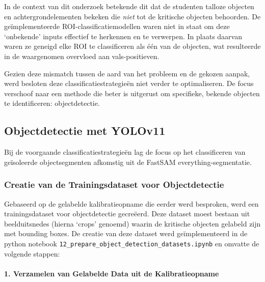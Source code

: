 In de context van dit onderzoek betekende dit dat de studenten talloze objecten en achtergrondelementen bekeken die \textit{niet} tot de kritische objecten behoorden.
De geïmplementeerde ROI-classificatiemodellen waren niet in staat om deze `onbekende' inputs effectief te herkennen en te verwerpen.
In plaats daarvan waren ze geneigd elke ROI te classificeren als één van de objecten, wat resulteerde in de waargenomen overvloed aan vals-positieven.

Gezien deze mismatch tussen de aard van het probleem en de gekozen aanpak, werd besloten deze classificatiestrategieën niet verder te optimaliseren.
De focus verschoof naar een methode die beter is uitgerust om specifieke, bekende objecten te identificeren: objectdetectie.

\subsection{Objectdetectie met YOLOv11} 

Bij de voorgaande classificatiestrategieën lag de focus op het classificeren van geïsoleerde objectsegmenten afkomstig uit de FastSAM everything-segmentatie.

\subsubsection{Creatie van de Trainingsdataset voor Objectdetectie}

Gebaseerd op de gelabelde kalibratieopname die eerder werd besproken, werd een trainingsdataset voor objectdetectie gecreëerd.
Deze dataset moest bestaan uit beelduitsnedes (hierna `crops' genoemd) waarin de kritische objecten gelabeld zijn met bounding boxes.
De creatie van deze dataset werd geïmplementeerd in de python notebook \texttt{12\_prepare\_object\_detection\_datasets.ipynb} en omvatte de volgende stappen:

\paragraph{1. Verzamelen van Gelabelde Data uit de Kalibratieopname}

